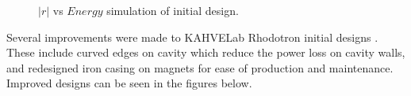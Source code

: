 \documentclass[a4paper,oneside,12pt]{report}
\numberwithin{equation}{chapter}
\begin{document}
\begin{figure}[H]
    \centering
    \vspace{1pt}
    \vspace{5pt}
    \caption{\centering $|r|$ vs $Energy$ simulation of initial design.} 
    \label{fig:initial_designs_PIC_phase_space_monitor}
\end{figure}

Several improvements were made to KAHVELab Rhodotron initial designs \cite{sinan}. These include curved edges on cavity which reduce the power loss on cavity walls, and redesigned iron casing on magnets for ease of production and maintenance.
Improved designs can be seen in the figures below.
\end{document}
